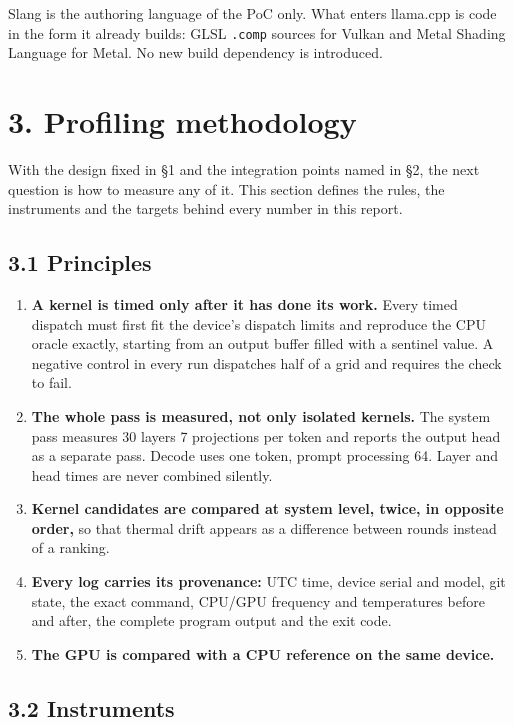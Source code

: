 \documentclass[
  10pt,
]{article}
\providecommand{\tightlist}{%
  \setlength{\itemsep}{0pt}\setlength{\parskip}{0pt}}
\begin{document}
Slang is the authoring language of the PoC only. What enters llama.cpp
is code in the form it already builds: GLSL \texttt{.comp} sources for
Vulkan and Metal Shading Language for Metal. No new build dependency is
introduced.

\section{3. Profiling methodology}\label{profiling-methodology}

With the design fixed in \S{}1 and the integration points named in
\S{}2, the next question is how to measure any of it. This section
defines the rules, the instruments and the targets behind every number
in this report.

\subsection{3.1 Principles}\label{principles}

\begin{enumerate}
\def\labelenumi{\arabic{enumi}.}
\tightlist%
\item
  \textbf{A kernel is timed only after it has done its work.} Every
  timed dispatch must first fit the device's dispatch limits and
  reproduce the CPU oracle exactly, starting from an output buffer
  filled with a sentinel value. A negative control in every run
  dispatches half of a grid and requires the check to fail.
\item
  \textbf{The whole pass is measured, not only isolated kernels.} The
  system pass measures 30 layers \texttimes{} 7 projections per token and
  reports the output head as a separate pass. Decode uses one token,
  prompt processing 64. Layer and head times are never combined silently.
\item
  \textbf{Kernel candidates are compared at system level, twice, in
  opposite order,} so that thermal drift appears as a difference between
  rounds instead of a ranking.
\item
  \textbf{Every log carries its provenance:} UTC time, device serial and
  model, git state, the exact command, CPU/GPU frequency and
  temperatures before and after, the complete program output and the
  exit code.
\item
  \textbf{The GPU is compared with a CPU reference on the same device.}
\end{enumerate}

\subsection{3.2 Instruments}\label{instruments}
\end{document}

